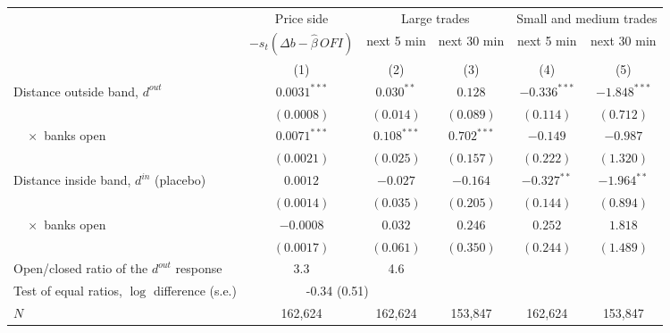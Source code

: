 \begin{tabular}{lccccc}
\toprule
 & Price side & \multicolumn{2}{c}{Large trades} & \multicolumn{2}{c}{Small and medium trades} \\
\cmidrule(lr){2-2}\cmidrule(lr){3-4}\cmidrule(lr){5-6}
 & $-s_t(\Delta b-\hat\beta\,\mathit{OFI})$ & next 5 min & next 30 min & next 5 min & next 30 min \\
 & (1) & (2) & (3) & (4) & (5) \\
\midrule
Distance outside band, $d^{out}$ & $0.0031^{***}$ & $0.030^{**}$ & $0.128$ & $-0.336^{***}$ & $-1.848^{***}$ \\
 & $(0.0008)$ & $(0.014)$ & $(0.089)$ & $(0.114)$ & $(0.712)$ \\
$\quad\times$ banks open & $0.0071^{***}$ & $0.108^{***}$ & $0.702^{***}$ & $-0.149$ & $-0.987$ \\
 & $(0.0021)$ & $(0.025)$ & $(0.157)$ & $(0.222)$ & $(1.320)$ \\
Distance inside band, $d^{in}$ (placebo) & $0.0012$ & $-0.027$ & $-0.164$ & $-0.327^{**}$ & $-1.964^{**}$ \\
 & $(0.0014)$ & $(0.035)$ & $(0.205)$ & $(0.144)$ & $(0.894)$ \\
$\quad\times$ banks open & $-0.0008$ & $0.032$ & $0.246$ & $0.252$ & $1.818$ \\
 & $(0.0017)$ & $(0.061)$ & $(0.350)$ & $(0.244)$ & $(1.489)$ \\
\midrule
Open/closed ratio of the $d^{out}$ response & 3.3 & 4.6 & & & \\
Test of equal ratios, $\log$ difference (s.e.) & \multicolumn{2}{c}{-0.34 (0.51)} & & & \\
$N$ & 162,624 & 162,624 & 153,847 & 162,624 & 153,847 \\
\bottomrule
\end{tabular}
